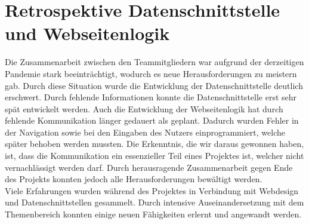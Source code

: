 \section{Retrospektive Datenschnittstelle und Webseitenlogik}
Die Zusammenarbeit zwischen den Teammitgliedern war aufgrund der derzeitigen Pandemie stark beeinträchtigt, wodurch es neue Herausforderungen zu meistern gab. Durch diese Situation wurde die Entwicklung der Datenschnittstelle deutlich erschwert. Durch fehlende Informationen konnte die Datenschnittstelle erst sehr spät entwickelt werden. Auch die Entwicklung der Webseitenlogik hat durch fehlende Kommunikation länger gedauert als geplant. Dadurch wurden Fehler in der Navigation sowie bei den Eingaben des Nutzers einprogrammiert, welche später behoben werden mussten. Die Erkenntnis, die wir daraus gewonnen haben, ist, dass die Kommunikation ein essenzieller Teil eines Projektes ist, welcher nicht vernachlässigt werden darf. Durch herausragende Zusammenarbeit gegen Ende des Projekts konnten jedoch alle Herausforderungen bewältigt werden.\\
Viele Erfahrungen wurden während des Projektes in Verbindung mit Webdesign und Datenschnittstellen gesammelt. Durch intensive Auseinandersetzung mit dem Themenbereich konnten einige neuen Fähigkeiten erlernt und angewandt werden.